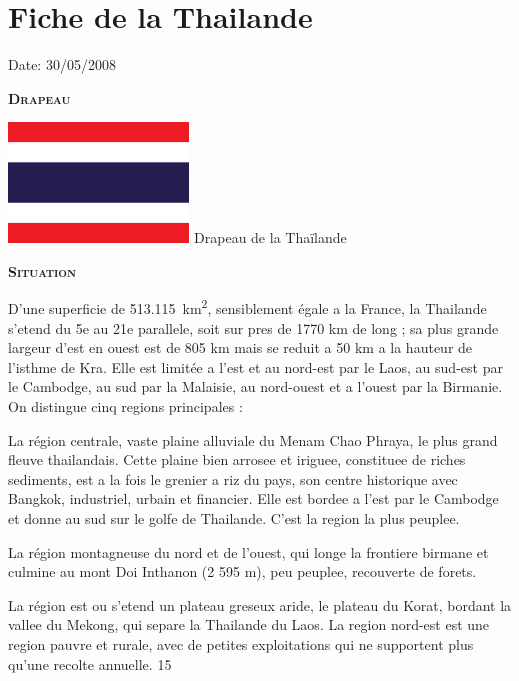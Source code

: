 \section{Fiche de la Thailande}

Date: 30/05/2008

\begin{multicols}{2}

\textbf{\textsc{Drapeau}}

\hspace*{-0.65cm}
\includegraphics[width=4.8cm]{articles/Fiche-de-la-thailande/drapeau_thailande.png}
Drapeau de la Thaïlande

\textbf{\textsc{Situation}}

D’une superficie de \SI{513.115}{km^2}, sensiblement égale a la France, la Thailande s’etend du 5e au 21e parallele, soit sur pres de 1770 km de long ; sa plus grande largeur d’est en ouest est de 805 km mais se reduit a 50 km a la hauteur de l’isthme de Kra.
Elle est limitée a l’est et au nord-est par le Laos, au sud-est par le Cambodge, au sud par la Malaisie, au nord-ouest et a l’ouest par la Birmanie. On distingue cinq regions principales :

La région centrale, vaste plaine alluviale du Menam Chao Phraya, le plus grand fleuve thailandais. Cette plaine bien arrosee et iriguee, constituee de riches sediments, est a la fois le grenier a riz du pays, son centre historique avec Bangkok, industriel, urbain et financier. Elle est bordee a l’est par le Cambodge et donne au sud sur le golfe de Thailande. C’est la region la plus peuplee.

La région montagneuse du nord et de l’ouest, qui longe la frontiere birmane et culmine au mont Doi Inthanon (2 595 m), peu peuplee, recouverte de forets.

La région est ou s’etend un plateau greseux aride, le plateau du Korat, bordant la vallee du Mekong, qui separe la Thailande du Laos. La region nord-est est une region pauvre et rurale, avec de petites exploitations qui ne supportent plus qu’une recolte annuelle. 15%


\end{multicols}
